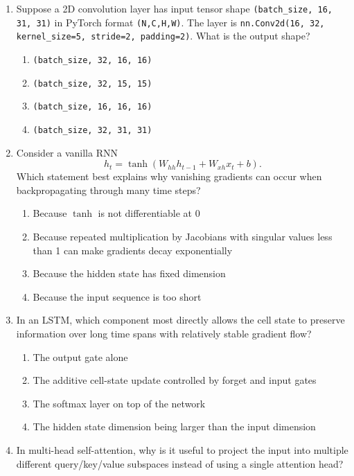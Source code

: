 \documentclass[11pt]{article}
\newcommand{\cmark}{\ding{51}}
\begin{document}
\begin{enumerate}[leftmargin=*]
\item Suppose a 2D convolution layer has input tensor shape \texttt{(batch\_size, 16, 31, 31)} in PyTorch format \texttt{(N,C,H,W)}. The layer is
\texttt{nn.Conv2d(16, 32, kernel\_size=5, stride=2, padding=2)}.
What is the output shape?

\begin{enumerate}[label=\Alph*.]
    \item \texttt{(batch\_size, 32, 16, 16)} \cmark
    \item \texttt{(batch\_size, 32, 15, 15)}
    \item \texttt{(batch\_size, 16, 16, 16)}
    \item \texttt{(batch\_size, 32, 31, 31)}
\end{enumerate}

\item Consider a vanilla RNN
\[
h_t = \tanh(W_{hh} h_{t-1} + W_{xh} x_t + b).
\]
Which statement best explains why vanishing gradients can occur when backpropagating through many time steps?

\begin{enumerate}[label=\Alph*.]
    \item Because $\tanh$ is not differentiable at 0
    \item Because repeated multiplication by Jacobians with singular values less than 1 can make gradients decay exponentially \cmark
    \item Because the hidden state has fixed dimension
    \item Because the input sequence is too short
\end{enumerate}

\item In an LSTM, which component most directly allows the cell state to preserve information over long time spans with relatively stable gradient flow?

\begin{enumerate}[label=\Alph*.]
    \item The output gate alone
    \item The additive cell-state update controlled by forget and input gates \cmark
    \item The softmax layer on top of the network
    \item The hidden state dimension being larger than the input dimension
\end{enumerate}

\item In multi-head self-attention, why is it useful to project the input into multiple different query/key/value subspaces instead of using a single attention head?


\end{enumerate}
\end{document}
